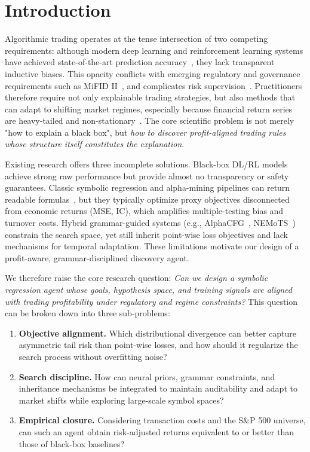\section{Introduction}
\label{sec:intro}

Algorithmic trading operates at the tense intersection of two competing requirements: although modern deep learning and reinforcement learning systems have achieved state-of-the-art prediction accuracy~\cite{fischer2018deep,zhang2020deep}, they lack transparent inductive biases. This opacity conflicts with emerging regulatory and governance requirements such as MiFID II~\cite{eu2014mifid}, and complicates risk supervision~\cite{rudin2019stop,weber2024comprehensive,cAo2022ai}. Practitioners therefore require not only explainable trading strategies, but also methods that can adapt to shifting market regimes, especially because financial return series are heavy-tailed and non-stationary~\cite{cont2001empirical}. The core scientific problem is not merely "how to explain a black box", but \textit{how to discover profit-aligned trading rules whose structure itself constitutes the explanation}.

Existing research offers three incomplete solutions. Black-box DL/RL models achieve strong raw performance but provide almost no transparency or safety guarantees. Classic symbolic regression and alpha-mining pipelines can return readable formulas~\cite{koza1994genetic,schmidt2009distilling}, but they typically optimize proxy objectives disconnected from economic returns (MSE, IC), which amplifies multiple-testing bias and turnover costs. Hybrid grammar-guided systems (e.g., AlphaCFG~\cite{yang2026alpha}, NEMoTS~\cite{xie2024nemots}) constrain the search space, yet still inherit point-wise loss objectives and lack mechanisms for temporal adaptation. These limitations motivate our design of a profit-aware, grammar-disciplined discovery agent.

We therefore raise the core research question: \textit{Can we design a symbolic regression agent whose goals, hypothesis space, and training signals are aligned with trading profitability under regulatory and regime constraints?} This question can be broken down into three sub-problems:

\begin{enumerate}
    \item[RQ1] \textbf{Objective alignment.} Which distributional divergence can better capture asymmetric tail risk than point-wise losses, and how should it regularize the search process without overfitting noise?
    \item[RQ2] \textbf{Search discipline.} How can neural priors, grammar constraints, and inheritance mechanisms be integrated to maintain auditability and adapt to market shifts while exploring large-scale symbol spaces?
    \item[RQ3] \textbf{Empirical closure.} Considering transaction costs and the S\&P 500 universe, can such an agent obtain risk-adjusted returns equivalent to or better than those of black-box baselines?
\end{enumerate}


